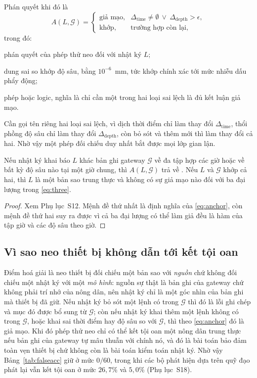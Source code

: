 Phán quyết khi đó là
\begin{equation}
A(L,\mathcal{G})=
\begin{cases}
\text{giả mạo}, & \Delta_{\mathrm{time}}\neq\emptyset
\ \vee\ \Delta_{\mathrm{depth}}>\epsilon,\\
\text{khớp}, & \text{trường hợp còn lại},
\end{cases}
\label{eq:anchor}
\end{equation}
trong đó:
\begin{symbolist}
\item[$A(L,\mathcal{G})$] phán quyết của phép thử neo đối với nhật ký $L$;
\item[$\epsilon$] dung sai so khớp độ sâu, bằng $10^{-6}$~mm, tức khớp chính xác tới mức nhiễu dấu phẩy động;
\item[$\vee$] phép hoặc logic, nghĩa là chỉ cần một trong hai loại sai lệch là đủ kết luận giả mạo.
\end{symbolist} Cần
gọi tên riêng hai loại sai lệch, vì dịch thời điểm chỉ làm thay đổi
$\Delta_{\mathrm{time}}$, thổi phồng độ sâu chỉ làm thay đổi
$\Delta_{\mathrm{depth}}$, còn bỏ sót và thêm mới thì làm thay đổi cả hai. Nhờ
vậy một phép đối chiếu duy nhất bắt được mọi lớp gian lận.

\begin{proposition}
\label{prop:complete}
Nếu nhật ký khai báo $L$ khác bản ghi gateway $\mathcal{G}$ về đa tập hợp các
giờ hoặc về bất kỳ độ sâu nào tại một giờ chung, thì $A(L,\mathcal{G})$ trả về
. Nếu $L$ và $\mathcal{G}$ khớp cả hai, thì $L$ là một bản sao
trung thực và không có sự giả mạo nào đối với ba đại lượng trong
\eqref{eq:three}.
\end{proposition}

\begin{proof}
Xem Phụ lục~S12. Mệnh đề thứ nhất là định nghĩa của \eqref{eq:anchor}, còn mệnh
đề thứ hai suy ra được vì cả ba đại lượng có thể làm giả đều là hàm của tập giờ
và các độ sâu theo giờ.
\end{proof}

\subsection{Vì sao neo thiết bị không dẫn tới kết tội oan}

Điểm hoá giải là neo thiết bị đối chiếu một bản sao với \emph{nguồn} chứ không đối chiếu
một nhật ký với một \emph{mô hình}: nguồn sự thật là bản ghi của gateway chứ không phải
trí nhớ của nông dân, nên nhật ký chỉ là một góc nhìn của bản ghi mà thiết bị đã giữ. Nếu
nhật ký bỏ sót một lệnh có trong $\mathcal{G}$ thì đó là lỗi ghi chép và mục đó được bổ
sung từ $\mathcal{G}$; còn nếu nhật ký khai thêm một lệnh không có trong $\mathcal{G}$,
hoặc khai sai thời điểm hay độ sâu so với $\mathcal{G}$, thì theo \eqref{eq:anchor} đó là
giả mạo. Khi đó phép thử neo chỉ có thể kết tội oan một nông dân trung thực nếu bản ghi
của gateway tự mâu thuẫn với chính nó, và đó là bài toán bảo đảm toàn vẹn thiết bị chứ
không còn là bài toán kiểm toán nhật ký. Nhờ vậy Bảng~\ref{tab:falseacc} giữ ở mức
$0/60$, trong khi các bộ phát hiện dựa trên quỹ đạo phát lại vẫn kết tội oan ở mức
$26{,}7\%$ và $5{,}0\%$ (Phụ lục~S18).

